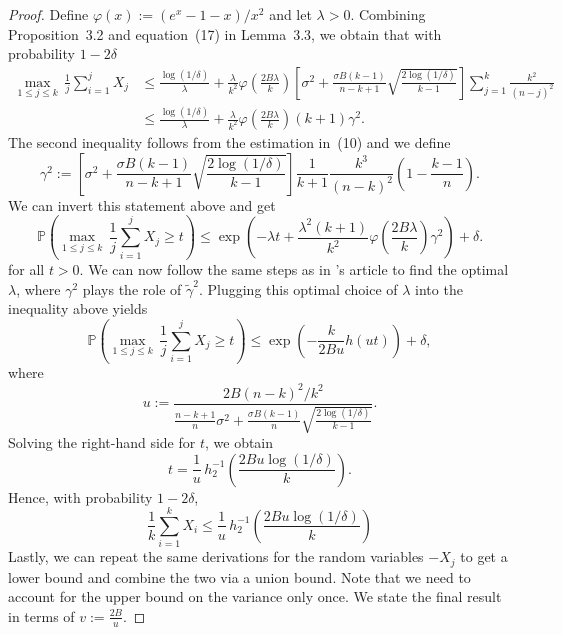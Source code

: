 \documentclass[aos]{imsart2}
\theoremstyle{plain}
\theoremstyle{definition}
\newcommand{\PR}{\mathbb{P}}
\begin{document}
\begin{appendix}
\begin{proof}
    Define $\varphi(x) := (e^x-1-x)/x^2 $ and let $\lambda >0$. Combining Proposition~3.2 and equation~(17) in Lemma~3.3, we obtain that with probability $1-2\delta$
    \begin{align*}
        \max_{1\leq j \leq k}\, \frac{1}{j}\sum_{i=1}^j X_j &\leq \frac{\log(1/\delta)}{\lambda} + \frac{\lambda}{k^2}\varphi\left(\frac{2B\lambda}{k}\right) \left[\sigma^2+\frac{\sigma B(k-1)}{n-k+1}\sqrt{\frac{2\log(1/\delta)}{k-1}}\right]\sum_{j=1}^k \frac{k^2}{(n-j)^2}\\
        &\leq \frac{\log(1/\delta)}{\lambda} + \frac{\lambda}{k^2}\varphi\left(\frac{2B\lambda}{k}\right) (k+1) \gamma^2.
    \end{align*}
    The second inequality follows from the estimation in~(10) and we define
    \begin{equation*}
        \gamma^2 := \left[\sigma^2+\frac{\sigma B(k-1)}{n-k+1}\sqrt{\frac{2\log(1/\delta)}{k-1}}\right] \frac{1}{k+1} \frac{k^3}{(n-k)^2}\left(1-\frac{k-1}{n}\right).
    \end{equation*}
    We can invert this statement above and get
    \begin{equation*}
        \PR\left(\max_{1\leq j \leq k}\, \frac{1}{j}\sum_{i=1}^j X_j \geq t\right)\leq \exp\left(-\lambda t +\frac{\lambda^2(k+1)}{k^2}\varphi\left(\frac{2B\lambda}{k}\right) \gamma^2\right) +\delta.
    \end{equation*}
    for all $t>0$. We can now follow the same steps as in \citeauthor{bardenet_concentration_2015}'s article to find the optimal $\lambda$, where $\gamma^2$ plays the role of $\tilde{\gamma}^2$. Plugging this optimal choice of $\lambda$ into the inequality above yields
     \begin{equation*}
        \PR\left(\max_{1\leq j \leq k}\, \frac{1}{j}\sum_{i=1}^j X_j \geq t\right) \leq \exp\left(-\frac{k}{2Bu}h(ut)\right)+\delta,
    \end{equation*}
    where
    \begin{equation*}
        u := \frac{2B(n-k)^2/k^2}{\frac{n-k+1}{n}\sigma^2+\frac{\sigma B(k-1)}{n}\sqrt{\frac{2\log(1/\delta)}{k-1}}}.
    \end{equation*}
   Solving the right-hand side for $t$, we obtain
    \begin{equation*}
        t = \frac{1}{u}\, h^{-1}_2\!\!\left(\frac{2Bu\log(1/\delta)}{k}\right).
    \end{equation*}
    Hence, with probability $1-2\delta$,
    \begin{equation*}
        \frac{1}{k}\sum_{i=1}^k X_i \leq \frac{1}{u}\, h^{-1}_2\!\!\left(\frac{2Bu\log(1/\delta)}{k}\right)
    \end{equation*}
    Lastly, we can repeat the same derivations for the random variables $-X_j$ to get a lower bound and combine the two via a union bound. Note that we need to account for the upper bound on the variance only once. We state the final result in terms of $v := \frac{2B}{u}$.
\end{proof}



\end{appendix}
\end{document}
